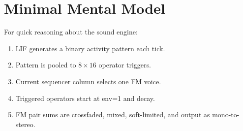 \documentclass[11pt,a4paper]{article}
\begin{document}
\section{Minimal Mental Model}
For quick reasoning about the sound engine:
\begin{enumerate}
    \item LIF generates a binary activity pattern each tick.
    \item Pattern is pooled to $8 \times 16$ operator triggers.
    \item Current sequencer column selects one FM voice.
    \item Triggered operators start at env=1 and decay.
    \item FM pair sums are crossfaded, mixed, soft-limited, and output as mono-to-stereo.
\end{enumerate}
\end{document}
